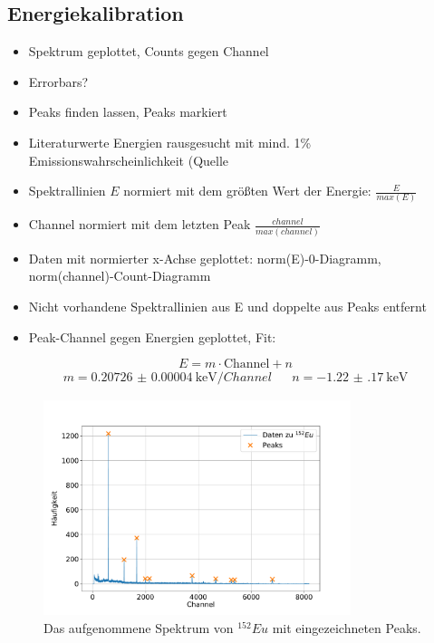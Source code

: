 \subsection{Energiekalibration}
\begin{itemize}
	\item Spektrum geplottet, Counts gegen Channel
	\item Errorbars?
	\item Peaks finden lassen, Peaks markiert
	\item Literaturwerte Energien rausgesucht mit mind. 1\% Emissionswahrscheinlichkeit (Quelle %
	\item Spektrallinien $E$ normiert mit dem größten Wert der Energie: $\frac{E}{max(E)}$
	\item Channel normiert mit dem letzten Peak $\frac{channel}{max(channel)}$
	\item Daten mit normierter x-Achse geplottet: norm(E)-0-Diagramm, norm(channel)-Count-Diagramm
	\item Nicht vorhandene Spektrallinien aus E und doppelte aus Peaks entfernt
	\item Peak-Channel gegen Energien geplottet, Fit:
\end{itemize}
\begin{equation*}
	E = m \cdot \text{Channel} + n
\end{equation*}
\begin{align*}
	m = \SI{0.20726(4)}{\kilo \electronvolt \per Channel} && n = \SI{-1.22(17)}{\kilo \electronvolt}
\end{align*}

\begin{figure}[h!]
  \centering
  \includegraphics[width=0.8\textwidth]{content/images/spektrum_europium.pdf}
  \caption{Das aufgenommene Spektrum von $^{152}Eu$ mit eingezeichneten Peaks.}
  \label{fig:eu_spect}
\end{figure}

